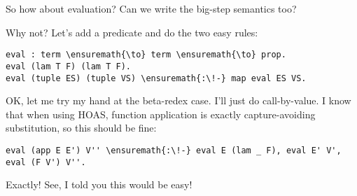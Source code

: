 \heroSTUDENT{} So how about evaluation? Can we write the big-step semantics
too?

\heroADVISOR{} Why not? Let's add a predicate and do the two easy rules:

\begin{verbatim}
eval : term \ensuremath{\to} term \ensuremath{\to} prop.
eval (lam T F) (lam T F).
eval (tuple ES) (tuple VS) \ensuremath{:\!-} map eval ES VS.
\end{verbatim}

\heroSTUDENT{} OK, let me try my hand at the beta-redex case. I'll just do
call-by-value. I know that when using HOAS, function application is
exactly capture-avoiding substitution, so this should be fine:

\begin{verbatim}
eval (app E E') V'' \ensuremath{:\!-} eval E (lam _ F), eval E' V', eval (F V') V''.
\end{verbatim}

\heroADVISOR{} Exactly! See, I told you this would be easy!
